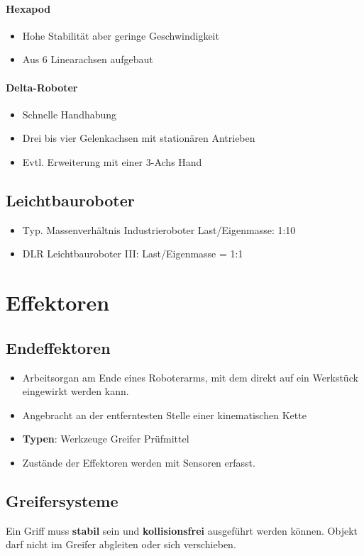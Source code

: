 \paragraph{Hexapod}
\begin{itemize}
	\item Hohe Stabilität aber geringe Geschwindigkeit
	\item Aus 6 Linearachsen aufgebaut
\end{itemize}
\paragraph{Delta-Roboter}
\begin{itemize}
	\item Schnelle Handhabung
	\item Drei bis vier Gelenkachsen mit stationären Antrieben
	\item Evtl. Erweiterung mit einer 3-Achs Hand
\end{itemize}
\subsection{Leichtbauroboter}
\begin{itemize}
	\item Typ. Massenverhältnis Industrieroboter Last/Eigenmasse: 1:10
	\item DLR Leichtbauroboter III: Last/Eigenmasse = 1:1
\end{itemize}
\section{Effektoren}
\subsection{Endeffektoren}
\begin{itemize}
	\item Arbeitsorgan am Ende eines Roboterarms, mit dem direkt auf ein Werkstück eingewirkt werden kann.
	\item Angebracht an der entferntesten Stelle einer kinematischen Kette
	\item \textbf{Typen}:
	\subitem Werkzeuge
	\subitem Greifer
	\subitem Prüfmittel
	\item  Zustände der Effektoren werden mit Sensoren erfasst.
\end{itemize}
\subsection{Greifersysteme}
Ein Griff muss \textbf{stabil} sein und \textbf{kollisionsfrei} ausgeführt werden können.
Objekt darf nicht im Greifer abgleiten oder sich verschieben.
